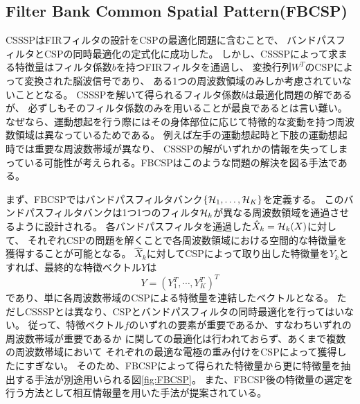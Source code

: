 \subsection{\rm Filter Bank Common Spatial Pattern(FBCSP)}
CSSSPはFIRフィルタの設計をCSPの最適化問題に含むことで、
バンドパスフィルタとCSPの同時最適化の定式化に成功した。
しかし、CSSSPによって求まる特徴量はフィルタ係数\(b\)を持つFIRフィルタを通過し、
変換行列\(W^T\)のCSPによって変換された脳波信号であり、
ある1つの周波数領域のみしか考慮されていないこととなる。
CSSSPを解いて得られるフィルタ係数\(b\)は最適化問題の解であるが、
必ずしもそのフィルタ係数のみを用いることが最良であるとは言い難い。
なぜなら、運動想起を行う際にはその身体部位に応じて特徴的な変動を持つ周波数領域は異なっているためである。
例えば左手の運動想起時と下肢の運動想起時では重要な周波数帯域が異なり、
CSSSPの解がいずれかの情報を失ってしまっている可能性が考えられる。FBCSPはこのような問題の解決を図る手法である\cite{fbcsp}。

まず、FBCSPではバンドパスフィルタバンク\(\{ {\cal H}_1, \ldots, {\cal H}_K \}\)を定義する。
このバンドパスフィルタバンクは1つ1つのフィルタ\({\cal H}_k\)が異なる周波数領域を通過させるように設計される。
各バンドパスフィルタを通過した\(\hat X_k = {\cal H}_k(X)\)に対して、
それぞれCSPの問題を解くことで各周波数領域における空間的な特徴量を獲得することが可能となる。
\({\hat X}_k\)に対してCSPによって取り出した特徴量を\(Y_k\)とすれば、最終的な特徴ベクトル\(Y\)は
\begin{equation}
    Y = (Y_1^T,\cdots, Y_K^T)^T
\end{equation}
であり、単に各周波数帯域のCSPによる特徴量を連結したベクトルとなる。
ただしCSSSPとは異なり、CSPとバンドパスフィルタの同時最適化を行ってはいない。
従って、特徴ベクトル\(f\)のいずれの要素が重要であるか、すなわちいずれの周波数帯域が重要であるか
に関しての最適化は行われておらず、あくまで複数の周波数帯域において
それぞれの最適な電極の重み付けをCSPによって獲得したにすぎない。
そのため、FBCSPによって得られた特徴量から更に特徴量を抽出する手法が別途用いられる図\ref{fig:FBCSP}。
また、FBCSP後の特徴量の選定を行う方法として相互情報量を用いた手法が提案されている\cite{fbcspBCICOMPE}。

